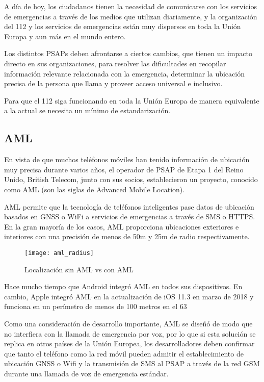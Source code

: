 A día de hoy, los ciudadanos tienen la necesidad de comunicarse con los servicios de emergencias a través de los medios que utilizan diariamente, y la organización del 112 y los servicios de emergencias están muy dispersos en toda la Unión Europa y aun más en el mundo entero.

Los distintos PSAPs deben afrontarse a ciertos cambios, que tienen un impacto directo en sus organizaciones, para resolver las dificultades en recopilar información relevante relacionada con la emergencia, determinar la ubicación precisa de la persona que llama y proveer acceso universal e inclusivo.

Para que el 112 siga funcionando en toda la Unión Europa de manera equivalente a la actual se necesita un mínimo de estandarización.

\subsection{AML}

En vista de que muchos teléfonos móviles han tenido información de ubicación muy precisa durante varios años, el operador de PSAP de Etapa 1 del Reino Unido, British Telecom, junto con sus socios, establecieron un proyecto, conocido como AML (son las siglas de Advanced Mobile Location).

AML permite que la tecnología de teléfonos inteligentes pase datos de ubicación basados en GNSS o WiFi a servicios de emergencias a través de SMS o HTTPS. En la gran mayoría de los casos, AML proporciona ubicaciones exteriores e interiores con una precisión de menos de 50m y 25m de radio respectivamente.

\begin{figure}[htp!]
  \centering
  \texttt{[image: aml\_radius]}
  \caption{Localización sin AML vs con AML}
  \label{fig:aml_radius}
\end{figure}

Hace mucho tiempo que Android integró AML en todos sus dispositivos. En cambio, Apple integró AML en la actualización de iOS 11.3 en marzo de 2018 y funciona en un perímetro de menos de 100 metros en el 63%

Como una consideración de desarrollo importante, AML se diseñó de modo que no interfiera con la llamada de emergencia por voz, por lo que si esta solución se replica en otros países de la Unión Europea, los desarrolladores deben confirmar que tanto el teléfono como la red móvil pueden admitir el establecimiento de ubicación GNSS o Wifi y la transmisión de SMS al PSAP a través de la red GSM durante una llamada de voz de emergencia estándar.

